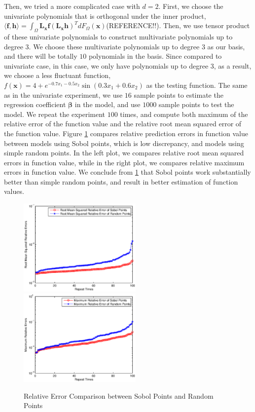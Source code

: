 \documentclass[preprint,12pt]{elsarticle}
\begin{document}
Then, we tried a more complicated case with $d=2$. First, we choose
the univariate polynomials that is orthogonal under the inner
product, $\langle \boldsymbol{f},\boldsymbol{h}
\rangle=\int_{\Omega}\mathbf{L}_{\boldsymbol{x}}\boldsymbol{f}\left(\mathbf{L}_{\boldsymbol{x}}\boldsymbol{h}\right)^TdF_{\Omega}(\boldsymbol{x})$(REFERENCE!!).
Then, we use tensor product of these univariate polynomials to
construct multivariate polynomials up to degree $3$. We choose these
multivariate polynomials up to degree $3$ as our basis, and there
will be totally $10$ polynomials in the basis. Since compared to
univariate case, in this case, we only have polynomials up to degree
$3$, as a result, we choose a less fluctuant function,
$f(\boldsymbol{x})=4+e^{-0.7x_1-0.5x_2}\sin(0.3x_1+0.6x_2)$ as the
testing function. The same as in the univariate experiment, we use
$16$ sample points to estimate the regression coefficient
$\boldsymbol{\beta}$ in the model, and use $1000$ sample points to
test the model. We repeat the experiment $100$ times, and compute
both maximum of the relative error of the function value and the
relative root mean squared error of the function value. Figure
\ref{fig:mulerror} compares relative prediction errors in function
value between models using Sobol points, which is low discrepancy,
and models using simple random points. In the left plot, we compares
relative root mean squared errors in function value, while in the
right plot, we compares relative maximum errors in function value.
We conclude from \ref{fig:mulerror} that Sobol points work
substantially better than simple random points, and result in better
estimation of function values.

\begin{figure}[htpb]
\begin{center}
\includegraphics[width=6cm]{mullognormerror.eps}
\includegraphics[width=6cm]{mullogsuperror.eps}
\caption{\label{fig:mulerror} Relative Error Comparison between
Sobol Points and Random Points}
\end{center}
\end{figure}
\end{document}
